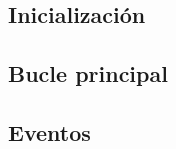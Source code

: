 \documentclass[parskip=half*]{scrartcl}
\begin{document}
	\subsection{Inicializaci\'on}

	\subsection{Bucle principal}

	\subsection{Eventos}

\end{document}
